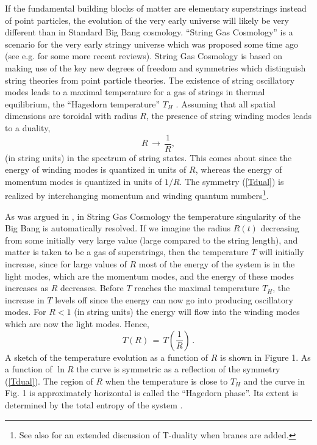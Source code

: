 \documentclass[prd, aps, superscriptaddress, preprintnumbers, twocolumn, floatfix, nofootinbib]{revtex4}
\begin{document}
If the fundamental building blocks of matter are elementary superstrings instead of point particles,
the evolution of the very early universe will likely be very different than in Standard Big Bang cosmology.
``String Gas Cosmology'' is a scenario for the very early stringy universe which was proposed some
time ago \cite{BV} (see e.g. \cite{SGCrevs} for some more recent reviews). String Gas Cosmology is
based on making use of the key new degrees of freedom and symmetries which distinguish string
theories from point particle theories. The existence of string oscillatory modes leads to a maximal
temperature for a gas of strings in thermal equilibrium, the ``Hagedorn temperature'' $T_H$ \cite{Hagedorn}.
Assuming that all spatial dimensions are toroidal with radius $R$, the presence of string winding modes leads to
a duality,
\begin{equation} \label{Tdual}
R  \, \rightarrow \, \frac{1}{R},
\end{equation}
(in string units) in the spectrum of string states. This comes about since the energy
of winding modes is quantized in units of $R$, whereas the energy of momentum modes
is quantized in units of $1/R$. The symmetry (\ref{Tdual}) is realized by interchanging
momentum and winding quantum numbers\footnote{See also \cite{Boehm} for an
extended discussion of T-duality when branes are added.}.

As was argued in \cite{BV}, in String Gas Cosmology the temperature singularity of the Big Bang
is automatically resolved. If we imagine the radius $R(t)$ decreasing from some initially
very large value (large compared to the string length), and matter is taken to be a gas of
superstrings, then the temperature $T$ will initially increase, since for large values of $R$ most
of the energy of the system is in the light modes, which are the momentum modes, and
the energy of these modes increases as $R$ decreases. Before $T$ reaches the maximal
temperature $T_H$, the increase in $T$ levels off since the energy can now go into producing
oscillatory modes. For $R < 1$ (in string units) the energy will flow into the winding modes which
are now the light modes. Hence,
\begin{equation}
T(R) \, = \, T\left(\frac{1}{R}\right) \, .
\end{equation}
A sketch of the temperature evolution as a function of $R$ is shown in Figure 1.
As a function of $\ln{R}$ the curve is symmetric as a reflection of the symmetry
(\ref{Tdual}). The region of $R$ when the temperature is close to $T_H$ and the
curve in Fig. 1 is approximately horizontal is called the ``Hagedorn phase''. Its
extent is determined by the total entropy of the system \cite{BV}.
\end{document}
